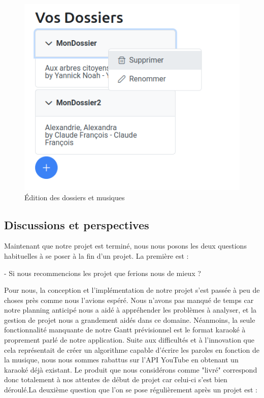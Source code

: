 \documentclass[12pt,french]{article}
\begin{document}
\begin{figure}[H]
\begin{minipage}{.3\textwidth}
	\end{minipage}
\begin{minipage}{.3\textwidth}
	\centering
	\includegraphics[scale=0.4]{dossier5.png}
\end{minipage}
	\caption{Édition des dossiers et musiques}    
\end{figure}

\newpage
\vspace*{1cm}

\subsection{Discussions et perspectives}

Maintenant que notre projet est terminé, nous nous posons les deux questions habituelles à se poser à la fin d'un projet. La première est : 
\newline

- Si nous recommencions les projet que ferions nous de mieux ?  
\newline


Pour nous, la conception et l'implémentation de notre projet s'est passée à peu de choses près comme nous l'avions espéré. Nous n'avons pas manqué de temps car notre planning anticipé nous a aidé à appréhender les problèmes à analyser, et la gestion de projet nous a grandement aidés dans ce domaine. Néanmoins, la seule fonctionnalité manquante de notre Gantt prévisionnel est le format karaoké à proprement parlé de notre application. Suite aux difficultés et à l'innovation que cela représentait de créer un algorithme capable d'écrire les paroles en fonction de la musique, nous nous sommes rabattus sur l'\gls{API} YouTube en obtenant un karaoké déjà existant. Le produit que nous considérons comme "livré" correspond donc totalement à nos attentes de début de projet car celui-ci s'est bien déroulé.La deuxième question que l'on se pose régulièrement après un projet est :
\newline
\end{document}
